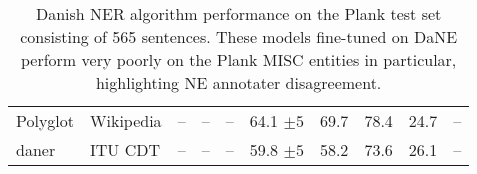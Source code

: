 \documentclass[main.tex]{subfiles}
\begin{document}
\begin{table}[H]
\begin{center}
\begin{tabular}{l l | c c c c | c c c c}
                        Polyglot      & Wikipedia      & --                   & --            & --            & 64.1         $\pm 5$& 69.7          & 78.4            & 24.7          & -- \\
                        daner         & ITU CDT        & --                   & --            & --            & 59.8         $\pm 5$& 58.2          & 73.6            & 26.1          & --
                \end{tabular}
        \end{center}
        \caption{
            Danish NER algorithm performance on the Plank \cite{plank2019neural} test set consisting of 565 sentences.
            These models fine-tuned on DaNE perform very poorly on the Plank MISC entities in particular, highlighting NE annotater disagreement.
        }
        \label{tab:Plank}
\end{table}


\end{document}
